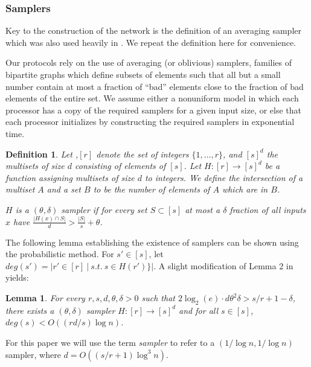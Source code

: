 \documentclass[letterpaper,11pt]{article}
\newtheorem{lemma}{Lemma}
\newtheorem{definition}{Definition}
\begin{document}
\subsubsection{Samplers}
Key to the construction of the network is the definition of an averaging sampler which was also used heavily in \cite{KKKSS-TALG,KSSV2}.
We repeat the definition here for convenience. 

Our protocols rely on the use of averaging (or
oblivious) samplers, families of bipartite graphs which define
subsets of elements such that all but a small number contain at
most a fraction of ``bad'' elements close to the fraction of bad
elements of the entire set.  We assume either a nonuniform model in
which each processor has a copy of the required samplers for a
given input size, or else that each processor initializes by
constructing the required samplers in exponential time.

\begin{definition}
Let ,$[r]$ denote the set of integers $\{1, \ldots, r\}$, and
$[s]^{d}$
the multisets of size $d$ consisting of elements of $[s]$.
Let $H: [r] \rightarrow [s]^{d}$ be a function assigning
multisets 
of size $d$ to integers. We define the intersection of a multiset $A$ and a set $B$ to be the number of 
elements of $A$ which are in $B$.


$H$ is a $(\theta, \delta)$ sampler if
for every set $S \subset [s]$
at most a $\delta$ fraction of all inputs $x$ have
$\frac{|H(x) \cap S|}{d} > \frac{|S|}{s} + \theta$.
\end{definition}

\medskip

The following lemma establishing the existence of samplers
can be shown using the probabilistic method.  For $s'\in[s]$, 
let $deg(s')=|r'  \in[r] ~|~s.t.~ s \in H(r') \}|$.  A slight modification of Lemma 2 in \cite{KKKSS-TALG} yields:

\begin{lemma} \label{l:samp2}
For every $r,s,d, \theta, \delta > 0$ 
such that $2 \log_2(e) \cdot d \theta^2 \delta> s/r + 1-\delta$,
there exists a $(\theta, \delta)$
sampler $H: [r] \rightarrow [s]^{d}$ and for all $s \in [s]$, $deg(s) < O((rd/s) \log n)$.
 \end{lemma}

\medskip

For this paper we will use the term {\it sampler} to refer to a  $(1/\log n, 1/\log n)$ sampler, where $d=O( (s/r+1) \log^3 n)$.
\end{document}
